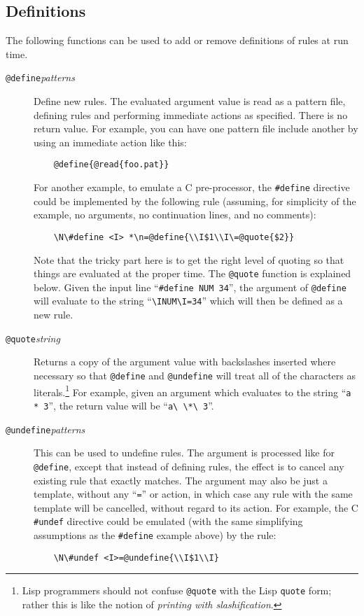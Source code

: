 \subsection{Definitions}
The following functions can be used to add or remove definitions of
rules at run time.

\begin{description}
\item[{\tt @define\ttlb}{\it patterns}{\tt \ttrb}]
Define new rules.
The evaluated argument value is read as a pattern file, defining rules
and performing immediate actions as specified.
There is no return value.
For example, you can have one pattern file include another by using an
immediate action like this:
\begin{verbatim}
    @define{@read{foo.pat}}
\end{verbatim}
For another example,
to emulate a C pre-processor, the \verb/#define/ directive
could be implemented by the following rule (assuming, for simplicity of the
example, no arguments, no continuation lines, and no comments):
\begin{verbatim}
    \N\#define <I> *\n=@define{\\I$1\\I\=@quote{$2}}
\end{verbatim}
Note that the tricky part here is to get the right level of quoting so
that things are evaluated at the proper time.  The \verb/@quote/
function is explained below.
Given the input line
``\verb/#define NUM 34/'', the argument of \verb/@define/ will evaluate
to the string ``\verb/\INUM\I=34/'' which will then be defined as a new
rule.

\item[{\tt @quote\ttlb}{\it string}{\tt \ttrb}]
Returns a copy of the argument value with backslashes inserted where necessary
so that \verb|@define| and \verb|@undefine|
will treat all of the characters as literals.\footnote{Lisp programmers
should not confuse {\tt @quote} with the Lisp {\tt quote} form; rather this is
like the notion of {\em printing with slashification}.}
For example, given an argument which evaluates to the string
``\verb/a * 3/'', the return value will be ``\verb/a\ \*\ 3/''.

\item[{\tt @undefine\ttlb}{\it patterns}{\tt \ttrb}]
This can be used to undefine rules.  The argument is processed like for
\verb/@define/, except that instead of defining rules, the effect
is to cancel any existing rule that exactly matches.  The argument may
also be just a template, without any ``\verb/=/'' or action, in which
case any rule with the same template will be cancelled, without regard
to its action.
For example, the C \verb/#undef/ directive could be emulated (with the
same simplifying assumptions as the \verb/#define/ example above) by the
rule:
\begin{verbatim}
    \N\#undef <I>=@undefine{\\I$1\\I}
\end{verbatim}


\end{description}
